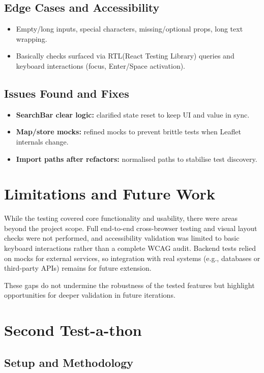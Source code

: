 \subsection{Edge Cases and Accessibility}
\begin{itemize}
    \item Empty/long inputs, special characters, missing/optional props, long text wrapping.
    \item Basically checks surfaced via RTL(React Testing Library) queries and keyboard interactions (focus, Enter/Space activation).
\end{itemize}

\subsection{Issues Found and Fixes}
\begin{itemize}
    \item \textbf{SearchBar clear logic:} clarified state reset to keep UI and value in sync.
    \item \textbf{Map/store mocks:} refined mocks to prevent brittle tests when Leaflet internals change.
    \item \textbf{Import paths after refactors:} normalised paths to stabilise test discovery.
\end{itemize}

\section{Limitations and Future Work}

While the testing covered core functionality and usability, there were areas beyond the project scope. 
Full end-to-end cross-browser testing and visual layout checks were not performed, and accessibility 
validation was limited to basic keyboard interactions rather than a complete WCAG audit. 
Backend tests relied on mocks for external services, so integration with real systems (e.g., databases or third-party APIs) 
remains for future extension. 

These gaps do not undermine the robustness of the tested features but highlight opportunities for deeper 
validation in future iterations.

\section{Second Test-a-thon}
\label{sec:testathon-two}

\subsection{Setup and Methodology}

